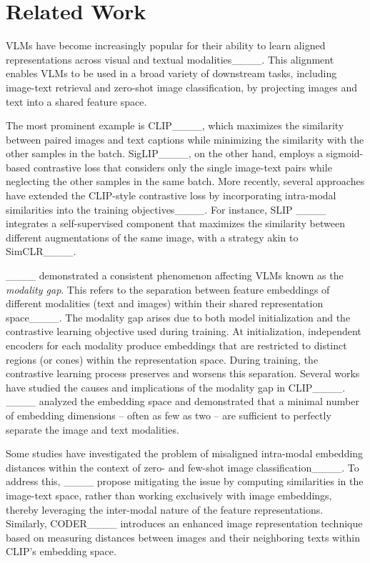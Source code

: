 \section{Related Work}
\label{sec:related_work}
VLMs have become increasingly popular for their ability to learn aligned representations across visual and textual modalities____. 
This alignment enables VLMs to be used in a broad variety of downstream tasks, including image-text retrieval and zero-shot image classification, by projecting images and text into a shared feature space.

The most prominent example is CLIP____, which maximizes the similarity between paired images and text captions while minimizing the similarity with the other samples in the batch. SigLIP____, on the other hand, employs a sigmoid-based contrastive loss that considers only the single image-text pairs while neglecting the other samples in the same batch.
More recently, several approaches have extended the CLIP-style contrastive loss by incorporating intra-modal similarities into the training objectives____. For instance, SLIP ____ integrates a self-supervised component that maximizes the similarity between different augmentations of the same image, with a strategy akin to SimCLR____. 

____ demonstrated a consistent phenomenon affecting VLMs known as the \textit{modality gap}. This refers to the separation between feature embeddings of different modalities (\eg text and images) within their shared representation space____. The modality gap arises due to both model initialization and the contrastive learning objective used during training. At initialization, independent encoders for each modality produce embeddings that are restricted to distinct regions (or cones) within the representation space. During training, the contrastive learning process preserves and worsens this separation. Several works have studied the causes and implications of the modality gap in CLIP____. ____ analyzed the embedding space and demonstrated that a minimal number of embedding dimensions -- often as few as two -- are sufficient to perfectly separate the image and text modalities. 

Some studies have investigated the problem of misaligned intra-modal embedding distances within the context of zero- and few-shot image classification____. To address this, ____ propose mitigating the issue by computing similarities in the image-text space, rather than working exclusively with image embeddings, thereby leveraging the inter-modal nature of the feature representations. Similarly, CODER____ introduces an enhanced image representation technique based on measuring distances between images and their neighboring texts within CLIP's embedding space. 

